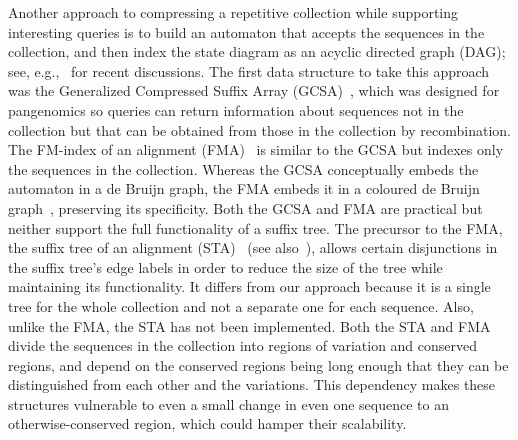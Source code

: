 Another approach to compressing a repetitive collection while supporting interesting queries is to build an automaton that accepts the sequences in the collection, and then index the state diagram as an acyclic directed graph (DAG); see, e.g.,~\cite{MaciucaEtAl16,PatenEtAl17,Siren17} for recent discussions.  The first data structure to take this approach was the Generalized Compressed Suffix Array (GCSA)~\cite{SVM14,Siren17}, which was designed for pangenomics so queries can return information about sequences not in the collection but that can be obtained from those in the collection by recombination.  The FM-index of an alignment (FMA)~\cite{NaKPLLMP16,NaEtAl17} is similar to the GCSA but indexes only the sequences in the collection. Whereas the GCSA conceptually embeds the automaton in a de Bruijn graph, the FMA embeds it in a coloured de Bruijn graph~\cite{IqbalEtAl12}, preserving its specificity.  Both the GCSA and FMA are practical but neither support the full functionality of a suffix tree.  The precursor to the FMA, the suffix tree of an alignment (STA)~\cite{NPCHIMP13} (see also~\cite{NPLHLMP13}), allows certain disjunctions in the suffix tree's edge labels in order to reduce the size of the tree while maintaining its functionality.  It differs from our approach because it is a single tree for the whole collection and not a separate one for each sequence. Also, unlike the FMA, the STA has not been implemented.  Both the STA and FMA divide the sequences in the collection into regions of variation and conserved regions, and depend on the conserved regions being long enough that they can be distinguished from each other and the variations.  This dependency makes these structures vulnerable to even a small change in even one sequence to an otherwise-conserved region, which could hamper their scalability.

